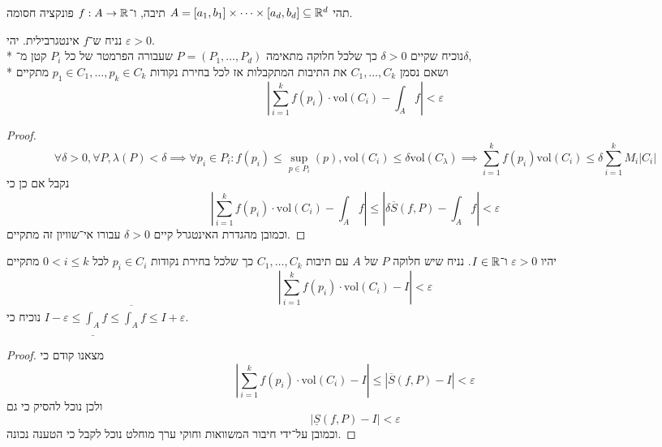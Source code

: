 \Question{}
תהי $A = [a_1, b_1] \times \cdots \times [a_d, b_d] \subseteq \mathbb{R}^d$ תיבה, ו־$f : A \to \mathbb{R}$ פונקציה חסומה.

\Subquestion{}
נניח ש־$f$ אינטגרבילית. יהי $\varepsilon > 0$. \\*
נוכיח שקיים $\delta > 0$ כך שלכל חלוקה מתאימה $P = (P_1, \dots, P_d)$ שעבורה הפרמטר של כל $P_i$ קטן מ־$\delta$, \\*
ושאם נסמן $C_1, \dots, C_k$ את התיבות המתקבלות אז לכל בחירת נקודות $p_1 \in C_1, \dots, p_k \in C_k$ מתקיים
\[
	\left\lvert \sum_{i = 1}^{k} f(p_i) \cdot \text{vol}(C_i) - \int_A f \right\rvert < \varepsilon
\]
\begin{proof}
	\[
		\forall \delta > 0, \forall P, \lambda(P) < \delta \implies \forall p_i \in P_i : f(p_i) \le \sup_{p \in P_i} (p), \text{vol}(C_i) \le \delta \text{vol}(C_\lambda)
		\implies \sum_{i = 1}^{k} f(p_i) \text{vol}(C_i) \le \delta \sum_{i = 1}^{k} M_i |C_i|
	\]
	נקבל אם כן כי
	\[
		\left\lvert \sum_{i = 1}^{k} f(p_i) \cdot \text{vol}(C_i) - \int_A f \right\rvert \le
		\left\lvert \delta \overline{S}(f, P) - \int_A f \right\rvert < \varepsilon
	\]
	וכמובן מהגדרת האינטגרל קיים $\delta > 0$ עבורו אי־שוויון זה מתקיים.
\end{proof}

\Subquestion{}
יהיו $\varepsilon > 0$ ו־$I \in \mathbb{R}$. נניח שיש חלוקה $P$ של $A$ עם תיבות $C_1, \dots, C_k$ כך שלכל בחירת נקודות $p_i \in C_i$ לכל $0 < i \le k$ מתקיים
\[
	\left\lvert \sum_{i = 1}^{k} f(p_i) \cdot \text{vol}(C_i) - I \right\rvert < \varepsilon
\]
נוכיח כי $I - \varepsilon \le \underline{\int_A} f \le \overline{\int_A} f \le I + \varepsilon$.
\begin{proof}
	מצאנו קודם כי
	\[
		\left\lvert \sum_{i = 1}^{k} f(p_i) \cdot \text{vol}(C_i) - I \right\rvert \le
		\left\lvert \overline{S}(f, P) - I \right\rvert < \varepsilon
	\]
	ולכן נוכל להסיק כי גם
	\[
		|\underline{S}(f, P) - I| < \varepsilon
	\]
	וכמובן על־ידי חיבור המשוואות וחוקי ערך מוחלט נוכל לקבל כי הטענה נכונה.
\end{proof}


